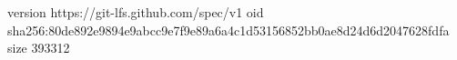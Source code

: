version https://git-lfs.github.com/spec/v1
oid sha256:80de892e9894e9abcc9e7f9e89a6a4c1d53156852bb0ae8d24d6d2047628fdfa
size 393312
